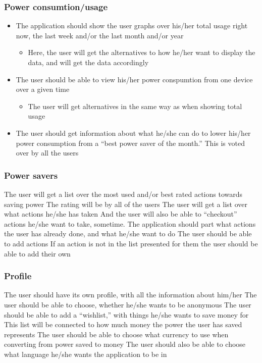 \begin{itemize}
\subsubsection{Power consumtion/usage}

\begin{itemize}
\item The application should show the user graphs over his/her total usage right now, the last week and/or the last month and/or year
\begin{itemize}
\item Here, the user will get the alternatives to how he/her want to display the data, and will get the data accordingly
\end{itemize}
\item The user should be able to view his/her power conspumtion from one device over a given time
\begin{itemize}
\item The user will get alternatives in the same way as when showing total usage
\end{itemize}
\item The user should get information about what he/she can do to lower his/her power consumption from a “best power saver of the month.” This is voted over by all the users
\end{itemize}

\subsubsection{Power savers}

The user will get a list over the most used and/or best rated actions towards saving power
The rating will be by all of the users
The user will get a list over what actions he/she has taken
And the user will also be able to “checkout” actions he/she want to take, sometime. The application should part what actions the user has already done, and what he/she want to do
The user should be able to add actions
If an action is not in the list presented for them the user should be able to add their own

\subsubsection{Profile}

The user should have its own profile, with all the information about him/her
The user should be able to choose, whether he/she wants to be anonymous
The user should be able to add a “wishlist,” with things he/she wants to save money for
This list will be connected to how much money the power the user has saved represents
The user should be able to choose what currency to use when converting from power saved to money
The user should also be able to choose what language he/she wants the application to be in


\end{itemize}
